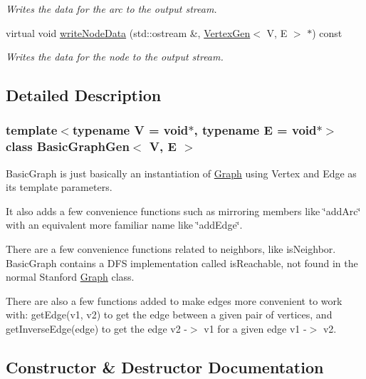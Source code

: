 \begin{DoxyCompactItemize}
\begin{DoxyCompactList}\small\item\em Writes the data for the arc to the output stream. \end{DoxyCompactList}\item 
virtual void \mbox{\hyperlink{classGraph_ac0db5231476c8cb10655d58ebc108b78}{write\+Node\+Data}} (std\+::ostream \&, \mbox{\hyperlink{classVertexGen}{Vertex\+Gen}}$<$ V, E $>$ $\ast$) const
\begin{DoxyCompactList}\small\item\em Writes the data for the node to the output stream. \end{DoxyCompactList}\end{DoxyCompactItemize}


\subsection{Detailed Description}
\subsubsection*{template$<$typename V = void$\ast$, typename E = void$\ast$$>$\newline
class Basic\+Graph\+Gen$<$ V, E $>$}

Basic\+Graph is just basically an instantiation of \mbox{\hyperlink{classGraph}{Graph}} using Vertex and Edge as its template parameters. 

It also adds a few convenience functions such as mirroring members like \char`\"{}add\+Arc\char`\"{} with an equivalent more familiar name like \char`\"{}add\+Edge\char`\"{}.

There are a few convenience functions related to neighbors, like is\+Neighbor. Basic\+Graph contains a D\+FS implementation called is\+Reachable, not found in the normal Stanford \mbox{\hyperlink{classGraph}{Graph}} class.

There are also a few functions added to make edges more convenient to work with\+: get\+Edge(v1, v2) to get the edge between a given pair of vertices, and get\+Inverse\+Edge(edge) to get the edge v2 -\/$>$ v1 for a given edge v1 -\/$>$ v2. 

\subsection{Constructor \& Destructor Documentation}
\mbox{\label{classBasicGraphGen_a9d6eaee0a2e8ea6de432f815463813fa}} 
